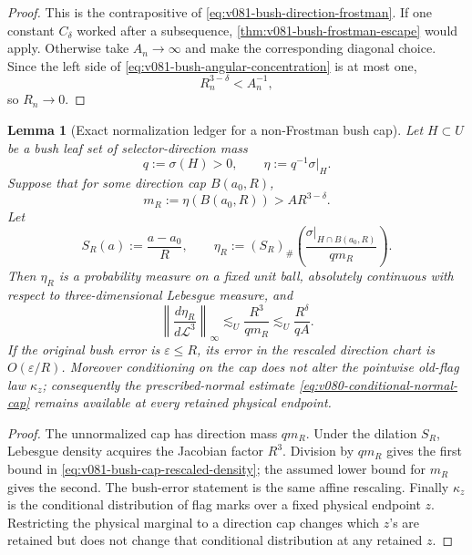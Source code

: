 \documentclass[10pt]{article}
\newtheorem{lemma}[theorem]{Lemma}
\begin{document}
\begin{proof}
This is the contrapositive of
\eqref{eq:v081-bush-direction-frostman}.  If one constant \(C_\delta\) worked after a subsequence,
\cref{thm:v081-bush-frostman-escape} would apply.  Otherwise take \(A_n\to\infty\) and make the
corresponding diagonal choice.  Since the left side of
\eqref{eq:v081-bush-angular-concentration} is at most one,
\[
R_n^{3-\delta}<A_n^{-1},
\]
so \(R_n\to0\).
\end{proof}

\begin{lemma}[Exact normalization ledger for a non-Frostman bush cap]
\label{lem:v081-bush-cap-normalization-ledger}
Let \(H\subset U\) be a bush leaf set of selector-direction mass
\[
q:=\sigma(H)>0,
\qquad
\eta:=q^{-1}\sigma|_H.
\]
Suppose that for some direction cap \(B(a_0,R)\),
\[
m_R
:=
\eta(B(a_0,R))
>
A R^{3-\delta}.
\]
Let
\[
S_R(a):=\frac{a-a_0}{R},
\qquad
\eta_R
:=
(S_R)_\#
\left(
\frac{\sigma|_{H\cap B(a_0,R)}}{qm_R}
\right).
\]
Then \(\eta_R\) is a probability measure on a fixed unit ball, absolutely continuous with respect
to three-dimensional Lebesgue measure, and
\begin{equation}
\label{eq:v081-bush-cap-rescaled-density}
\boxed{
\left\|\frac{d\eta_R}{d\mathcal L^3}\right\|_\infty
\lesssim_U
\frac{R^3}{qm_R}
\lesssim_U
\frac{R^\delta}{qA}.
}
\end{equation}
If the original bush error is \(\varepsilon\le R\), its error in the rescaled direction chart is
\(O(\varepsilon/R)\).  Moreover conditioning on the cap does not alter the pointwise old-flag law
\(\kappa_z\); consequently the prescribed-normal estimate
\eqref{eq:v080-conditional-normal-cap} remains available at every retained physical endpoint.
\end{lemma}

\begin{proof}
The unnormalized cap has direction mass \(qm_R\).  Under the dilation \(S_R\), Lebesgue density
acquires the Jacobian factor \(R^3\).  Division by \(qm_R\) gives the first bound in
\eqref{eq:v081-bush-cap-rescaled-density}; the assumed lower bound for \(m_R\) gives the second.
The bush-error statement is the same affine rescaling.  Finally \(\kappa_z\) is the conditional
distribution of flag marks over a fixed physical endpoint \(z\).  Restricting the physical
marginal to a direction cap changes which \(z\)'s are retained but does not change that conditional
distribution at any retained \(z\).
\end{proof}
\end{document}
